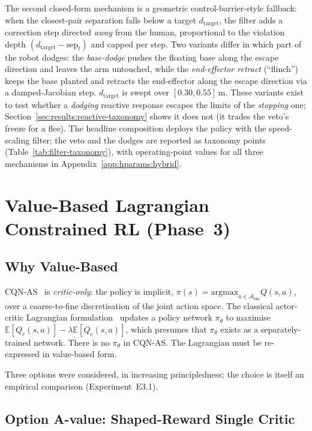 \documentclass[11pt,a4paper]{report}
\newcommand{\cqnas}{CQN-AS}
\begin{document}
The second closed-form mechanism is a geometric
control-barrier-style fallback: when the closest-pair separation
falls below a target $d_{\mathrm{target}}$, the filter adds a
correction step directed \emph{away} from the human, proportional to
the violation depth $(d_{\mathrm{target}} - \mathrm{sep}_t)$ and
capped per step. Two variants differ in which part of the robot
dodges: the \emph{base-dodge} pushes the floating base along the
escape direction and leaves the arm untouched, while the
\emph{end-effector retract} (``flinch'') keeps the base planted and
retracts the end-effector along the escape direction via a
damped-Jacobian step. $d_{\mathrm{target}}$ is swept over
$[0.30, 0.55]$\,m. These variants exist to test whether a
\emph{dodging} reactive response escapes the limits of the
\emph{stopping} one; Section~\ref{sec:results:reactive-taxonomy}
shows it does not (it trades the veto's freeze for a flee). The
headline composition deploys the policy with the speed-scaling
filter; the veto and the dodges are reported as taxonomy points
(Table~\ref{tab:filter-taxonomy}), with operating-point values for
all three mechanisms in Appendix~\ref{app:hparams:hybrid}.


\section{Value-Based Lagrangian Constrained RL (Phase~3)}
\label{sec:method:lagrangian}

\subsection{Why Value-Based}
\label{sec:method:lagrangian:why}

\cqnas{}~\cite{seo2024cqnas} is \emph{critic-only}: the policy is
implicit, $\pi(s) = \mathrm{argmax}_{a \in
\mathcal{A}_{\mathrm{bin}}} Q(s, a)$, over a coarse-to-fine
discretisation of the joint action space. The classical
actor-critic Lagrangian formulation~\cite{ray2019safetygym,
stooke2020pid} updates a policy network $\pi_\theta$ to maximise
$\mathbb{E}[Q_r(s,a)] - \lambda \mathbb{E}[Q_c(s,a)]$, which
presumes that $\pi_\theta$ exists as a separately-trained network.
There is no $\pi_\theta$ in \cqnas{}. The Lagrangian must be
re-expressed in value-based form.

Three options were considered, in increasing principledness; the
choice is itself an empirical comparison
(Experiment~E3.1).

\subsection{Option A-value: Shaped-Reward Single Critic}
\label{sec:method:lagrangian:A}
\end{document}
